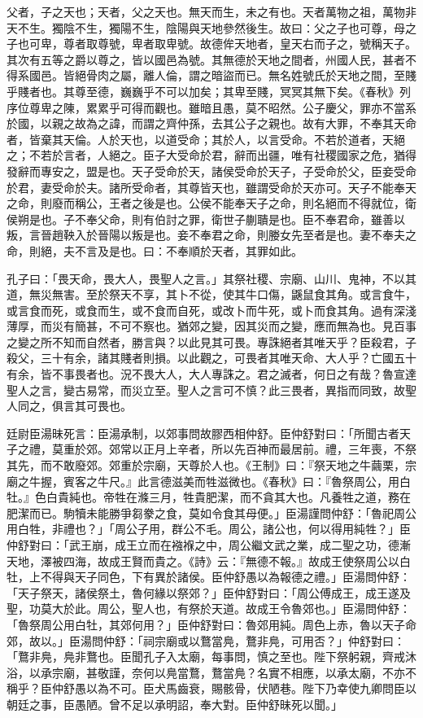 
父者，子之天也；天者，父之天也。無天而生，未之有也。天者萬物之祖，萬物非天不生。獨陰不生，獨陽不生，陰陽與天地參然後生。故曰：父之子也可尊，母之子也可卑，尊者取尊號，卑者取卑號。故德侔天地者，皇天右而子之，號稱天子。其次有五等之爵以尊之，皆以國邑為號。其無德於天地之間者，州國人民，甚者不得系國邑。皆絕骨肉之屬，離人倫，謂之暗盜而已。無名姓號氏於天地之間，至賤乎賤者也。其尊至德，巍巍乎不可以加矣；其卑至賤，冥冥其無下矣。《春秋》列序位尊卑之陳，累累乎可得而觀也。雖暗且愚，莫不昭然。公子慶父，罪亦不當系於國，以親之故為之諱，而謂之齊仲孫，去其公子之親也。故有大罪，不奉其天命者，皆棄其天倫。人於天也，以道受命；其於人，以言受命。不若於道者，天絕之；不若於言者，人絕之。臣子大受命於君，辭而出疆，唯有社稷國家之危，猶得發辭而專安之，盟是也。天子受命於天，諸侯受命於天子，子受命於父，臣妾受命於君，妻受命於夫。諸所受命者，其尊皆天也，雖謂受命於天亦可。天子不能奉天之命，則廢而稱公，王者之後是也。公侯不能奉天子之命，則名絕而不得就位，衛侯朔是也。子不奉父命，則有伯討之罪，衛世子蒯聵是也。臣不奉君命，雖善以叛，言晉趙鞅入於晉陽以叛是也。妾不奉君之命，則媵女先至者是也。妻不奉夫之命，則絕，夫不言及是也。曰：不奉順於天者，其罪如此。

孔子曰：「畏天命，畏大人，畏聖人之言。」其祭社稷、宗廟、山川、鬼神，不以其道，無災無害。至於祭天不享，其卜不從，使其牛口傷，鼷鼠食其角。或言食牛，或言食而死，或食而生，或不食而自死，或改卜而牛死，或卜而食其角。過有深淺薄厚，而災有簡甚，不可不察也。猶郊之變，因其災而之變，應而無為也。見百事之變之所不知而自然者，勝言與？以此見其可畏。專誅絕者其唯天乎？臣殺君，子殺父，三十有余，諸其賤者則損。以此觀之，可畏者其唯天命、大人乎？亡國五十有余，皆不事畏者也。況不畏大人，大人專誅之。君之滅者，何日之有哉？魯宣達聖人之言，變古易常，而災立至。聖人之言可不慎？此三畏者，異指而同致，故聖人同之，俱言其可畏也。


廷尉臣湯昧死言：臣湯承制，以郊事問故膠西相仲舒。臣仲舒對曰：「所聞古者天子之禮，莫重於郊。郊常以正月上辛者，所以先百神而最居前。禮，三年喪，不祭其先，而不敢廢郊。郊重於宗廟，天尊於人也。《王制》曰：『祭天地之牛繭栗，宗廟之牛握，賓客之牛尺。』此言德滋美而牲滋微也。《春秋》曰：『魯祭周公，用白牡。』色白貴純也。帝牲在滌三月，牲貴肥潔，而不貪其大也。凡養牲之道，務在肥潔而已。駒犢未能勝爭芻豢之食，莫如令食其母便。」臣湯謹問仲舒：「魯祀周公用白牲，非禮也？」「周公子用，群公不毛。周公，諸公也，何以得用純牲？」臣仲舒對曰：「武王崩，成王立而在襁褓之中，周公繼文武之業，成二聖之功，德漸天地，澤被四海，故成王賢而貴之。《詩》云：『無德不報。』故成王使祭周公以白牡，上不得與天子同色，下有異於諸侯。臣仲舒愚以為報德之禮。」臣湯問仲舒：「天子祭天，諸侯祭土，魯何緣以祭郊？」臣仲舒對曰：「周公傅成王，成王遂及聖，功莫大於此。周公，聖人也，有祭於天道。故成王令魯郊也。」臣湯問仲舒：「魯祭周公用白牡，其郊何用？」臣仲舒對曰：魯郊用純。周色上赤，魯以天子命郊，故以。」臣湯問仲舒：「祠宗廟或以鶩當鳧，鶩非鳧，可用否？」仲舒對曰：「鶩非鳧，鳧非鶩也。臣聞孔子入太廟，每事問，慎之至也。陛下祭躬親，齊戒沐浴，以承宗廟，甚敬謹，奈何以鳧當鶩，鶩當鳧？名實不相應，以承太廟，不亦不稱乎？臣仲舒愚以為不可。臣犬馬齒衰，賜骸骨，伏陋巷。陛下乃幸使九卿問臣以朝廷之事，臣愚陋。曾不足以承明詔，奉大對。臣仲舒昧死以聞。」

